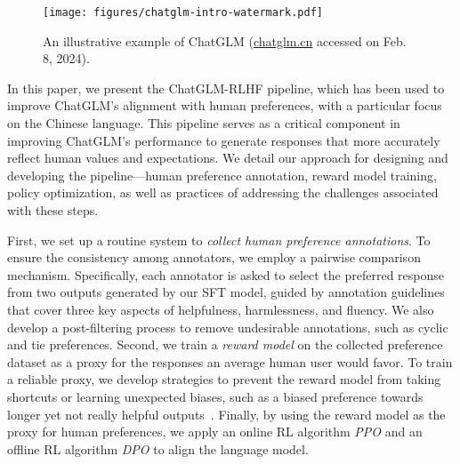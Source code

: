 \begin{figure}
    \centering
    \texttt{[image: figures/chatglm-intro-watermark.pdf]}
    \caption{An illustrative example of ChatGLM \textmd{(\textcolor{blue}{\url{chatglm.cn}} accessed on Feb. 8, 2024).}}
    \label{fig:enter-label}
    \vspace{-3mm}
\end{figure}

In this paper, we present the ChatGLM-RLHF pipeline, which has been used to improve ChatGLM's alignment with human preferences, with a particular focus on the Chinese language. 
This pipeline serves as a critical component in improving  ChatGLM's performance to generate responses that more accurately reflect human values and expectations. 
We detail our approach for designing and developing the pipeline---human preference annotation, reward model training, policy optimization, as well as practices of addressing the challenges associated with these steps. 

First, we set up a routine system to \textit{collect human preference annotations}. 
To ensure the consistency among annotators, we employ a pairwise comparison mechanism. 
Specifically, each annotator is asked to select the preferred response from two outputs generated by our SFT model, guided by annotation guidelines that cover three key aspects of helpfulness, harmlessness, and fluency. 
We also develop a post-filtering process to remove undesirable annotations, such as cyclic and tie preferences. %
Second, we train a \textit{reward model} on the collected preference dataset as a proxy for the responses an average human user would favor. 
To train a reliable proxy, we develop strategies to prevent the reward model from taking shortcuts or learning unexpected biases, such as a biased preference towards longer yet not really helpful outputs~\cite{singhal2023long,shen2023loose}. 
Finally, by using the reward model as the proxy for human preferences, we apply an online RL algorithm \textit{PPO} and an offline RL algorithm \textit{DPO} \cite{rafailov2023direct} to align the language model.  

